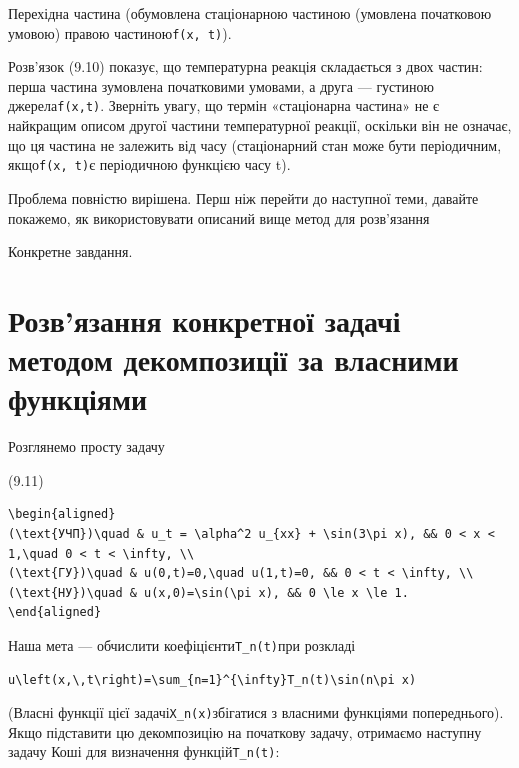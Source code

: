 \documentclass[
  ukrainian,
]{article}
\begin{document}
Перехідна частина (обумовлена стаціонарною частиною (умовлена початковою
умовою) правою частиною\texttt{f(x,\ t)}).

Розв'язок (9.10) показує, що температурна реакція складається з двох
частин: перша частина зумовлена початковими умовами, а друга ---
густиною джерела\texttt{f(x,t)}. Зверніть увагу, що термін «стаціонарна
частина» не є найкращим описом другої частини температурної реакції,
оскільки він не означає, що ця частина не залежить від часу
(стаціонарний стан може бути періодичним, якщо\texttt{f(x,\ t)}є
періодичною функцією часу t).

Проблема повністю вирішена. Перш ніж перейти до наступної теми, давайте
покажемо, як використовувати описаний вище метод для розв'язання

Конкретне завдання.

\section{Розв'язання конкретної задачі методом декомпозиції за власними
функціями}\label{ux440ux43eux437ux432ux44fux437ux430ux43dux43dux44f-ux43aux43eux43dux43aux440ux435ux442ux43dux43eux457-ux437ux430ux434ux430ux447ux456-ux43cux435ux442ux43eux434ux43eux43c-ux434ux435ux43aux43eux43cux43fux43eux437ux438ux446ux456ux457-ux437ux430-ux432ux43bux430ux441ux43dux438ux43cux438-ux444ux443ux43dux43aux446ux456ux44fux43cux438}

Розглянемо просту задачу

(9.11)

\begin{verbatim}
\begin{aligned}
(\text{УЧП})\quad & u_t = \alpha^2 u_{xx} + \sin(3\pi x), && 0 < x < 1,\quad 0 < t < \infty, \\
(\text{ГУ})\quad & u(0,t)=0,\quad u(1,t)=0, && 0 < t < \infty, \\
(\text{НУ})\quad & u(x,0)=\sin(\pi x), && 0 \le x \le 1.
\end{aligned}
\end{verbatim}

Наша мета --- обчислити коефіцієнти\texttt{T\_n(t)}при розкладі

\begin{verbatim}
u\left(x,\,t\right)=\sum_{n=1}^{\infty}T_n(t)\sin(n\pi x)
\end{verbatim}

(Власні функції цієї задачі\texttt{X\_n(x)}збігатися з власними
функціями попереднього). Якщо підставити цю декомпозицію на початкову
задачу, отримаємо наступну задачу Коші для визначення
функцій\texttt{T\_n(t)}:
\end{document}

